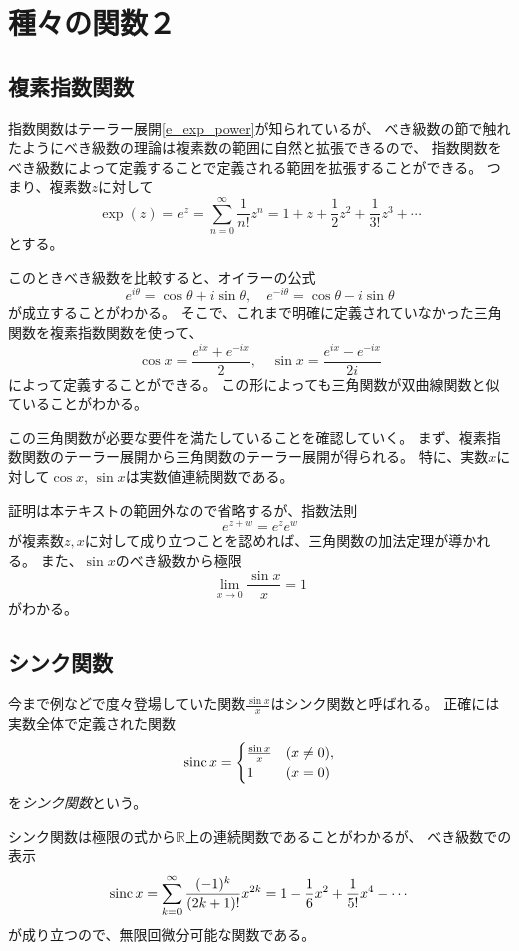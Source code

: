 
\chapter{種々の関数２}

\section{複素指数関数}

指数関数はテーラー展開\eqref{e_exp_power}が知られているが、
べき級数の節で触れたようにべき級数の理論は複素数の範囲に自然と拡張できるので、
指数関数をべき級数によって定義することで定義される範囲を拡張することができる。
つまり、複素数$z$に対して
$$
\exp(z) = e^z = \sum_{n = 0}^\infty \frac{1}{n!}z^n = 1+z+\frac{1}{2}z^2+\frac{1}{3!}z^3+\cdots
$$
とする。

このときべき級数を比較すると、オイラーの公式
$$
e^{i\theta} = \cos\theta+i\sin\theta,
\quad e^{-i\theta} = \cos\theta-i\sin\theta
$$
が成立することがわかる。
そこで、これまで明確に定義されていなかった三角関数を複素指数関数を使って、
$$
\cos x = \frac{e^{i x}+e^{-i x}}{2},
\quad \sin x = \frac{e^{i x}-e^{-i x}}{2 i}
$$
によって定義することができる。
この形によっても三角関数が双曲線関数と似ていることがわかる。

この三角関数が必要な要件を満たしていることを確認していく。
まず、複素指数関数のテーラー展開から三角関数のテーラー展開が得られる。
特に、実数$x$に対して$\cos x$, $\sin x$は実数値連続関数である。

証明は本テキストの範囲外なので省略するが、指数法則
$$
e^{z+w} = e^z e^w
$$
が複素数$z, x$に対して成り立つことを認めれば、三角関数の加法定理が導かれる。
また、$\sin x$のべき級数から極限
$$
\lim_{x \to 0}\frac{\sin x}{x} = 1
$$
がわかる。

\section{シンク関数}

今まで例などで度々登場していた関数$\frac{\sin x}{x}$はシンク関数と呼ばれる。
正確には実数全体で定義された関数
$$
\operatorname{sinc} x =
\begin{cases}
\frac{\sin x}{x} & (x \ne 0), \\
1 & (x = 0) \\
\end{cases}
$$
を\emph{シンク関数}という。

シンク関数は極限の式から$\mathbb{R}$上の連続関数であることがわかるが、
べき級数での表示
$$
\operatorname{sinc} x = \sum_{k = 0}^\infty \frac{(-1)^k}{(2 k+1)!}x^{2 k} = 1-\frac{1}{6}x^2+\frac{1}{5!}x^4-\cdots
$$
が成り立つので、無限回微分可能な関数である。

